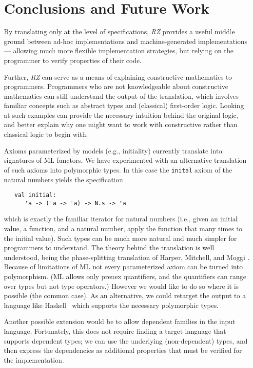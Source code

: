 \section{Conclusions and Future Work}
\label{sec:conclusion}

By translating only at the level of specifications, \emph{RZ} provides a
useful middle ground between ad-hoc implementations and
machine-generated implementations --- allowing much more flexible
implementation strategies, but relying on the programmer to
verify properties of their code.

Further, \emph{RZ} can serve as a means of explaining constructive
mathematics to programmers.  Programmers who are not knowledgeable
about constructive mathematics can still understand the output of the
translation, which involves familiar concepts such as abstract types
and (classical) first-order logic.   Looking at such examples can
provide the necessary intuition behind the original logic, and better
explain why one might want to work with constructive rather than
classical logic to begin with.

\bigskip
 
Axioms parameterized by models (e.g., initiality) currently translate
into signatures of ML functors.  We have experimented with an
alternative translation of such axioms into polymorphic types.  In
this case the \Verb|inital| axiom of the natural numbers yields
the specification
\begin{Verbatim}
   val initial: 
      'a -> ('a -> 'a) -> N.s -> 'a
\end{Verbatim}
which is exactly the familiar iterator for natural numbers (i.e., given
an initial value, a function, and a natural number, apply the function 
that many times to the initial value).  
Such types can be much more natural and much simpler for
programmers to understand.  The theory behind the translation is
well understood, being the phase-splitting translation of
Harper, Mitchell, and Moggi \cite{harper+:popl90}.  Because of
limitations of ML not every parameterized axiom can be
turned into polymorphism. (ML allows only prenex quantifiers, and the
quantifiers can range over types but not type operators.)  However
we would like to do so where it is possible (the common
case).  As an alternative, we could retarget the output to a language
like Haskell~\cite{haskell} which supports the necessary polymorphic types.

Another possible extension would be to allow dependent families in the
input language. Fortunately, this does not require finding a target
language that supports dependent types; we can use the underlying
(non-dependent) types, and then express the dependencies as additional
properties that must be verified for the implementation.


